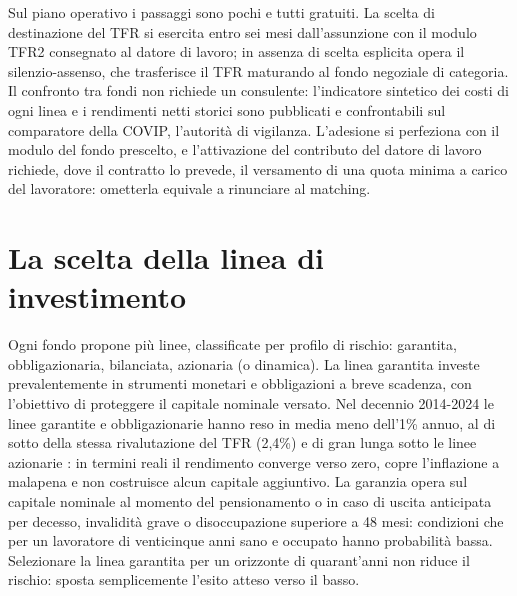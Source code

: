\medskip
\noindent
Sul piano operativo i passaggi sono pochi e tutti gratuiti. La scelta
di destinazione del TFR si esercita entro sei mesi dall'assunzione con
il modulo TFR2 consegnato al datore di lavoro; in assenza di scelta
esplicita opera il silenzio-assenso, che trasferisce il TFR maturando
al fondo negoziale di categoria. Il confronto tra fondi non richiede un
consulente: l'indicatore sintetico dei costi di ogni linea e i
rendimenti netti storici sono pubblicati e confrontabili sul
comparatore della COVIP, l'autorità di vigilanza. L'adesione si
perfeziona con il modulo del fondo prescelto, e l'attivazione del
contributo del datore di lavoro richiede, dove il contratto lo prevede,
il versamento di una quota minima a carico del lavoratore: ometterla
equivale a rinunciare al matching.

\section{La scelta della linea di investimento}
\label{sec:linea_investimento}

\noindent
Ogni fondo propone più linee, classificate per profilo di rischio:
garantita, obbligazionaria, bilanciata, azionaria (o dinamica).
La linea garantita investe prevalentemente in strumenti monetari e
obbligazioni a breve scadenza, con l'obiettivo di proteggere il
capitale nominale versato. Nel decennio 2014-2024 le linee garantite e obbligazionarie hanno reso
in media meno dell'1\% annuo, al di sotto della stessa rivalutazione del
TFR (2,4\%) e di gran lunga sotto le linee azionarie \cite{COVIP2024}:
in termini reali il rendimento converge verso zero, copre l'inflazione a
malapena e non costruisce alcun capitale aggiuntivo. La garanzia opera sul capitale nominale al momento del
pensionamento o in caso di uscita anticipata per decesso, invalidità
grave o disoccupazione superiore a 48 mesi: condizioni che per un
lavoratore di venticinque anni sano e occupato hanno probabilità
bassa. Selezionare la linea garantita per un orizzonte di
quarant'anni non riduce il rischio: sposta semplicemente l'esito
atteso verso il basso.

